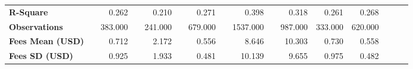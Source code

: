 \begin{tabular}{@{\extracolsep{5pt}}lrrrrrrrrrrrrrrr}
{\bf R-Square} & \phantom{***} & 0.262\phantom{***} & \phantom{***} & 0.210\phantom{***} & \phantom{***} & 0.271\phantom{***} & \phantom{***} & 0.398\phantom{***} & \phantom{***} & 0.318\phantom{***} & 0.261\phantom{***} & 0.268\phantom{***} \\
{\bf Observations} & \phantom{***} & 383.000\phantom{***} & \phantom{***} & 241.000\phantom{***} & \phantom{***} & 679.000\phantom{***} & \phantom{***} & 1537.000\phantom{***} & \phantom{***} & 987.000\phantom{***} & 333.000\phantom{***} & 620.000\phantom{***} \\
{\bf Fees Mean (USD)} & \phantom{***} & 0.712\phantom{***} & \phantom{***} & 2.172\phantom{***} & \phantom{***} & 0.556\phantom{***} & \phantom{***} & 8.646\phantom{***} & \phantom{***} & 10.303\phantom{***} & 0.730\phantom{***} & 0.558\phantom{***} \\
{\bf Fees SD (USD)} & \phantom{***} & 0.925\phantom{***} & \phantom{***} & 1.933\phantom{***} & \phantom{***} & 0.481\phantom{***} & \phantom{***} & 10.139\phantom{***} & \phantom{***} & 9.655\phantom{***} & 0.975\phantom{***} & 0.482\phantom{***} \\
\hline
\end{tabular}
